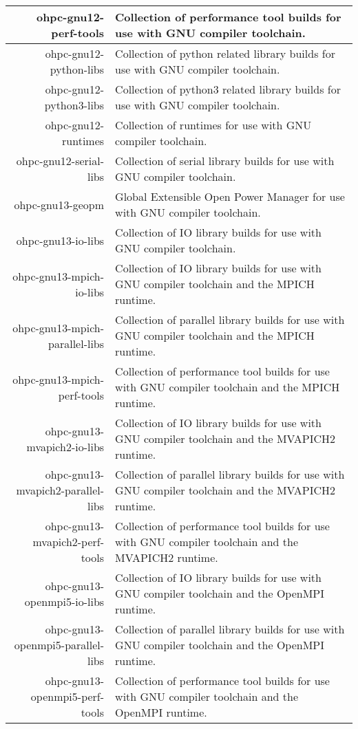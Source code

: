 \begin{tabularx}{\textwidth}{r|X}
\hline
ohpc-gnu12-perf-tools & Collection of performance tool builds for use with GNU compiler toolchain. \\
\hline
ohpc-gnu12-python-libs & Collection of python related library builds for use with GNU compiler toolchain. \\
\hline
ohpc-gnu12-python3-libs & Collection of python3 related library builds for use with GNU compiler toolchain. \\
\hline
ohpc-gnu12-runtimes & Collection of runtimes for use with GNU compiler toolchain. \\
\hline
ohpc-gnu12-serial-libs & Collection of serial library builds for use with GNU compiler toolchain. \\
\hline
ohpc-gnu13-geopm & Global Extensible Open Power Manager for use with GNU compiler toolchain. \\
\hline
ohpc-gnu13-io-libs & Collection of IO library builds for use with GNU compiler toolchain. \\
\hline
ohpc-gnu13-mpich-io-libs & Collection of IO library builds for use with GNU compiler toolchain and the MPICH runtime. \\
\hline
ohpc-gnu13-mpich-parallel-libs & Collection of parallel library builds for use with GNU compiler toolchain and the MPICH runtime. \\
\hline
ohpc-gnu13-mpich-perf-tools & Collection of performance tool builds for use with GNU compiler toolchain and the MPICH runtime. \\
\hline
ohpc-gnu13-mvapich2-io-libs & Collection of IO library builds for use with GNU compiler toolchain and the MVAPICH2 runtime. \\
\hline
ohpc-gnu13-mvapich2-parallel-libs & Collection of parallel library builds for use with GNU compiler toolchain and the MVAPICH2 runtime. \\
\hline
ohpc-gnu13-mvapich2-perf-tools & Collection of performance tool builds for use with GNU compiler toolchain and the MVAPICH2 runtime. \\
\hline
ohpc-gnu13-openmpi5-io-libs & Collection of IO library builds for use with GNU compiler toolchain and the OpenMPI runtime. \\
\hline
ohpc-gnu13-openmpi5-parallel-libs & Collection of parallel library builds for use with GNU compiler toolchain and the OpenMPI runtime. \\
\hline
ohpc-gnu13-openmpi5-perf-tools & Collection of performance tool builds for use with GNU compiler toolchain and the OpenMPI runtime. \\

\end{tabularx}
